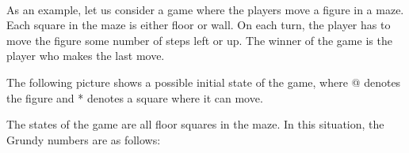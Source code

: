 ~\\
\noindent
As an example, let us consider a game where
the players move a figure in a maze.
Each square in the maze is either floor or wall.
On each turn, the player has to move
the figure some number
of steps left or up.
The winner of the game is the player who
makes the last move.

\begin{samepage}
The following picture shows a possible initial state
of the game, where @ denotes the figure and *
denotes a square where it can move.

\begin{center}
\end{center}
\end{samepage}

The states of the game are all floor squares
in the maze.
In this situation, the Grundy numbers
are as follows:

